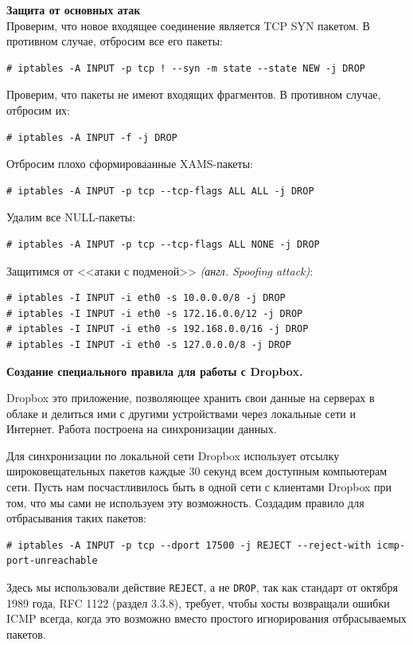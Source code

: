 \documentclass[a4paper]{article}
\begin{document}
		\textbf{Защита от основных атак}\\
		Проверим, что новое входящее соединение является TCP SYN пакетом. В противном случае, отбросим все его пакеты:
		\begin{verbatim}
# iptables -A INPUT -p tcp ! --syn -m state --state NEW -j DROP
		\end{verbatim}
		Проверим, что пакеты не имеют входящих фрагментов. В противном случае, отбросим их:
		\begin{verbatim}
# iptables -A INPUT -f -j DROP
		\end{verbatim}
		Отбросим плохо сформироваанные XAMS-пакеты:
		\begin{verbatim}
# iptables -A INPUT -p tcp --tcp-flags ALL ALL -j DROP
		\end{verbatim}
		Удалим все NULL-пакеты:
		\begin{verbatim}
# iptables -A INPUT -p tcp --tcp-flags ALL NONE -j DROP
		\end{verbatim}
		Защитимся от <<атаки с подменой>> \emph{(англ. Spoofing attack)}:
		\begin{verbatim}
# iptables -I INPUT -i eth0 -s 10.0.0.0/8 -j DROP
# iptables -I INPUT -i eth0 -s 172.16.0.0/12 -j DROP
# iptables -I INPUT -i eth0 -s 192.168.0.0/16 -j DROP
# iptables -I INPUT -i eth0 -s 127.0.0.0/8 -j DROP
		\end{verbatim}
		
		\textbf{Создание специального правила для работы с Dropbox.}
		
		Dropbox это приложение, позволяющее хранить свои данные на серверах в облаке и делиться ими с другими устройствами через локальные сети и Интернет. Работа построена на синхронизации данных.
		
		Для синхронизации по локальной сети Dropbox использует отсылку широковещательных пакетов каждые 30 секунд всем доступным компьютерам сети. Пусть нам посчастливилось быть в одной сети с клиентами Dropbox при том, что мы сами не используем эту возможность. Создадим правило для отбрасывания таких пакетов:
		\begin{verbatim}
# iptables -A INPUT -p tcp --dport 17500 -j REJECT --reject-with icmp-port-unreachable
		\end{verbatim}

		Здесь мы использовали действие \texttt{REJECT}, а не \texttt{DROP}, так как стандарт от октября 1989 года, RFC 1122 (раздел 3.3.8), требует, чтобы хосты возвращали ошибки ICMP всегда, когда это возможно вместо простого игнорирования отбрасываемых пакетов.
		
\end{document}
